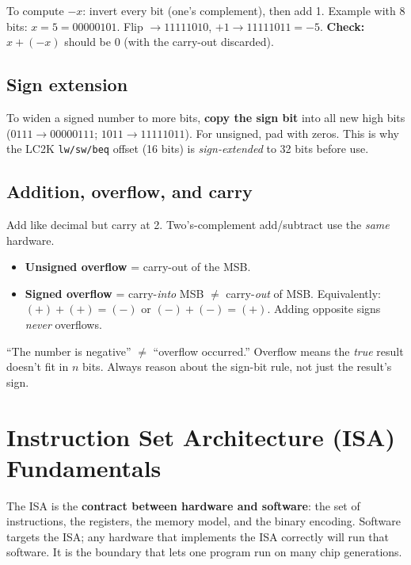 \documentclass[10pt]{article}
\newcommand{\code}[1]{\texttt{\small #1}}
\begin{document}
\begin{keybox}
To compute $-x$: invert every bit (one's complement), then add 1.
Example with 8 bits: $x=5=00000101$. Flip $\to 11111010$, $+1 \to 11111011 = -5$.
\textbf{Check:} $x + (-x)$ should be $0$ (with the carry-out discarded).
\end{keybox}

\subsection{Sign extension}
To widen a signed number to more bits, \textbf{copy the sign bit} into all new high bits
($0111\to 00000111$; $1011\to 11111011$). For unsigned, pad with zeros. This is why the
LC2K \code{lw/sw/beq} offset (16 bits) is \emph{sign-extended} to 32 bits before use.

\subsection{Addition, overflow, and carry}
Add like decimal but carry at 2. Two's-complement add/subtract use the \emph{same} hardware.
\begin{itemize}
\item \textbf{Unsigned overflow} = carry-out of the MSB.
\item \textbf{Signed overflow} = carry-\emph{into} MSB $\neq$ carry-\emph{out} of MSB.
Equivalently: $(+) + (+) = (-)$ or $(-) + (-) = (+)$. Adding opposite signs \emph{never} overflows.
\end{itemize}

\begin{pitbox}
``The number is negative'' $\neq$ ``overflow occurred.'' Overflow means the \emph{true} result
doesn't fit in $n$ bits. Always reason about the sign-bit rule, not just the result's sign.
\end{pitbox}

\section{Instruction Set Architecture (ISA) Fundamentals}

\begin{keybox}
The ISA is the \textbf{contract between hardware and software}: the set of instructions, the
registers, the memory model, and the binary encoding. Software targets the ISA; any hardware
that implements the ISA correctly will run that software. It is the boundary that lets one
program run on many chip generations.
\end{keybox}
\end{document}

